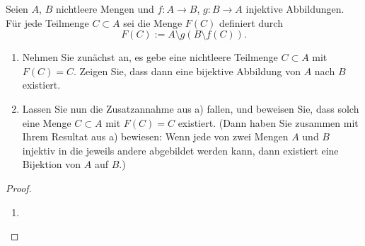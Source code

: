 \documentclass{../problemset}
\begin{document}
\begin{problem}
Seien $A$, $B$ nichtleere Mengen und $f : A \to B$, $g : B \to A$ injektive Abbildungen. Für jede Teilmenge $C \subset A$ sei die Menge $F(C)$ definiert durch
\[ F(C) := A \setminus g(B \setminus f(C)). \]

\begin{enumerate}
	\item Nehmen Sie zunächst an, es gebe eine nichtleere Teilmenge $C \subset A$ mit $F(C) = C$. Zeigen Sie, dass dann eine bijektive Abbildung von $A$ nach $B$ existiert.
	\item Lassen Sie nun die Zusatzannahme aus a) fallen, und beweisen Sie, dass solch eine Menge $C \subset A$ mit $F(C) = C$ existiert. (Dann haben Sie zusammen mit Ihrem Resultat aus a) bewiesen: Wenn jede von zwei Mengen $A$ und $B$ injektiv in die jeweils andere abgebildet werden kann, dann existiert eine Bijektion von $A$ auf $B$.)
\end{enumerate}

\begin{proof}
	\begin{enumerate}
		\item
	\end{enumerate}
\end{proof}
\end{problem}
\end{document}
